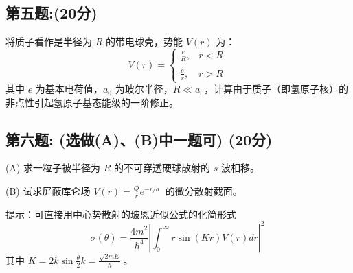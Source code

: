 \subsection{第五题:(20分)}
将质子看作是半径为 \(R\) 的带电球壳，势能 \(V(r)\) 为：
\[V(r) = \begin{cases} \frac{e}{R}, & r < R \\\\\frac{e}{r}, & r > R\end{cases}~\]
其中 \(e\) 为基本电荷值，\(a_0\) 为玻尔半径，\(R \ll a_0\)，计算由于质子（即氢原子核）的非点性引起氢原子基态能级的一阶修正。
\subsection{第六题: (选做(A)、(B)中一题可) (20分)}
(A) 求一粒子被半径为 \(R\) 的不可穿透硬球散射的 \(s\) 波相移。

(B) 试求屏蔽库仑场 \(V(r) = \frac{Q}{r} e^{-r/a}~\) 的微分散射截面。

提示：可直接用中心势散射的玻恩近似公式的化简形式
\[\sigma(\theta) = \frac{4m^2}{\hbar^4} \left| \int_0^\infty r \sin(Kr) V(r) dr \right|^2~\]
其中 \(K = 2k \sin\frac{\theta}{2}\)\( k = \frac{\sqrt{2mE}}{\hbar} ~\)。